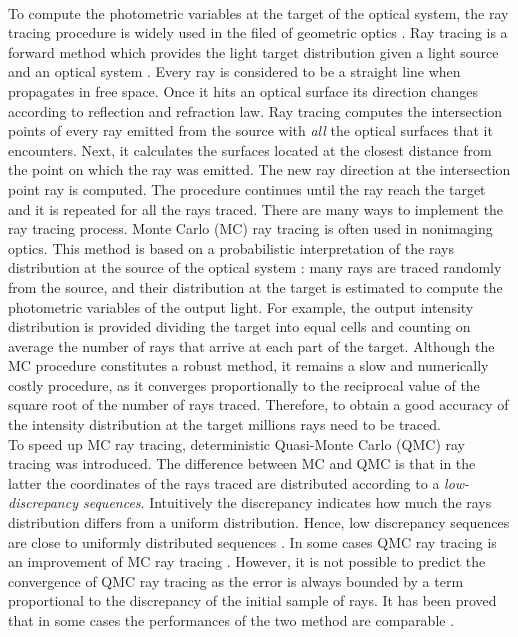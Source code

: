 \\ \indent To compute the photometric variables at the target of the
optical system, the ray tracing procedure is widely used in the filed of geometric optics \cite{glassner1989introduction}.
Ray tracing is a forward method which provides the light target distribution given a light source and an optical system \cite{Gross2005Handbook}. Every ray is considered to be a straight line when propagates in free space. Once it hits an optical surface its direction changes according to reflection and refraction law. Ray tracing computes the intersection points of every ray emitted from the source with \textit{all} the optical surfaces that it encounters. Next, it calculates the surfaces located at the closest distance from the point on which the ray was emitted. The new ray direction at the intersection point ray is computed. The procedure continues until the ray reach the target and it is repeated for all the rays traced.
There are many ways to implement the ray tracing
process. Monte Carlo (MC) ray tracing is often used in nonimaging
optics. This method is based on a probabilistic interpretation
of the rays distribution at the source of the optical
system \cite{liu2010precise,Ting:1}: many rays are traced randomly from the source,
and their distribution at the target is estimated to compute the
photometric variables of the output light. For example, the output intensity distribution is provided dividing the target into equal cells and counting on average the number of rays that arrive at each part of the target. Although the MC
procedure constitutes a robust method, it remains a slow and
numerically costly procedure, as it converges proportionally
to the reciprocal value of the square root of the number of rays
traced. Therefore, to obtain a good accuracy of the intensity distribution at the target millions rays need to be traced.\\ \indent To speed up MC ray tracing, deterministic Quasi-Monte Carlo (QMC) ray tracing was introduced. The difference between MC and QMC is that in the latter the coordinates of the rays traced are distributed according to a \textit{low-discrepancy sequences}. Intuitively the discrepancy indicates how much the rays distribution differs from a uniform distribution.  Hence, low discrepancy sequences are close to uniformly distributed sequences \cite{levy2002introduction}.
In some cases QMC ray tracing is an improvement of MC ray tracing \cite{ohbuchi1996quasi, caflisch1998monte}. However, it is not possible to predict the convergence of QMC ray tracing as the error is always bounded by a term proportional to the discrepancy of the initial sample of rays. It has been proved that in some cases the performances of the two method are comparable \cite{tuffin2004randomization}. 

